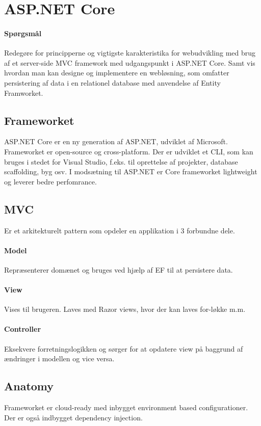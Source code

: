 \section{ASP.NET Core}

\paragraph{Spørgsmål}
Redegøre for principperne og vigtigste karakteristika for webudvikling med brug af et server-side MVC framework med udgangspunkt i ASP.NET Core. Samt vis hvordan man kan designe og implementere en	webløsning, som omfatter persistering af data i en relationel database med anvendelse af Entity Framworket.

\subsection{Frameworket}
ASP.NET Core er en ny generation af ASP.NET, udviklet af Microsoft. Frameworket er open-source og cross-platform.
Der er udviklet et CLI, som kan bruges i stedet for Visual Studio, f.eks. til oprettelse af projekter, database scaffolding, byg osv.
I modsætning til ASP.NET er Core frameworket lightweight og leverer bedre perfomrance.

\subsection{MVC}
Er et arkitekturelt pattern som opdeler en applikation i 3 forbundne dele.

\paragraph{Model} Repræsenterer domænet og bruges ved hjælp af EF til at persistere data.

\paragraph{View} Vises til brugeren. Laves med Razor views, hvor der kan laves for-løkke m.m.

\paragraph{Controller} Eksekvere forretningslogikken og sørger for at opdatere view på baggrund af ændringer i modellen og vice versa.

\subsection{Anatomy}
Frameworket er cloud-ready med inbygget environment based configurationer. Der er også indbygget dependency injection.

